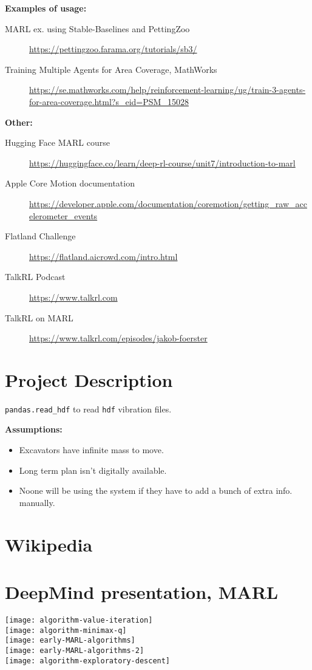 \documentclass{article}
\begin{document}
\noindent
\textbf{Examples of usage:}
\begin{description}
  \item[MARL ex. using Stable-Baselines and PettingZoo] \url{https://pettingzoo.farama.org/tutorials/sb3/}
  \item[Training Multiple Agents for Area Coverage, MathWorks] \url{https://se.mathworks.com/help/reinforcement-learning/ug/train-3-agents-for-area-coverage.html?s_eid=PSM_15028}
\end{description}

\noindent
\textbf{Other:}
\begin{description}
  \item[Hugging Face MARL course] \url{https://huggingface.co/learn/deep-rl-course/unit7/introduction-to-marl}
  \item[Apple Core Motion documentation] \url{https://developer.apple.com/documentation/coremotion/getting_raw_accelerometer_events}
  \item[Flatland Challenge] \url{https://flatland.aicrowd.com/intro.html}
  \item[TalkRL Podcast] \url{https://www.talkrl.com}
  \item[TalkRL on MARL] \url{https://www.talkrl.com/episodes/jakob-foerster}
\end{description}


\section*{Project Description}\label{sec.proj_desc}
\texttt{pandas.read_hdf} to read \texttt{hdf} vibration files.

\noindent
\textbf{Assumptions:}
\begin{itemize}
  \item Excavators have infinite mass to move.\\
  \item Long term plan isn't digitally available.\\
  \item Noone will be using the system if they have to add a bunch of extra info. manually.
\end{itemize}


\section*{Wikipedia}      \label{sec.wiki}


\section*{DeepMind presentation, MARL}\label{sec.deepmind}
\texttt{[image: algorithm-value-iteration]}\\
\texttt{[image: algorithm-minimax-q]}\\
\texttt{[image: early-MARL-algorithms]}\\
\texttt{[image: early-MARL-algorithms-2]}\\
\texttt{[image: algorithm-exploratory-descent]}\\
\end{document}
